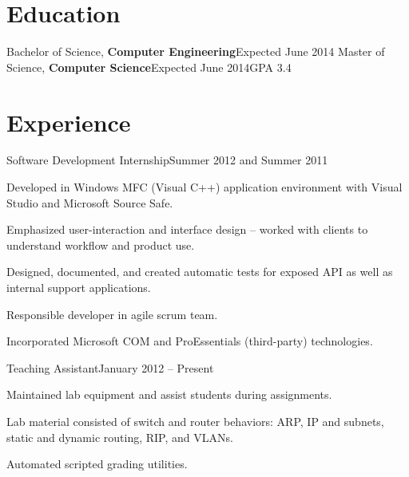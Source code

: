 \documentclass[margin,line,oneside,a4paper]{resume}
\begin{document}
\begin{resume}


   \createContactInformation


   \section{\mysidestyle Education}

   {Bachelor of Science, \textbf{Computer Engineering}}{Expected June 2014}%
   {Master of Science, \textbf{Computer Science}}{Expected June 2014}{GPA 3.4}

   \section{\mysidestyle Experience}

   {Software Development Internship}{Summer 2012 and Summer 2011}
   \begin{list2}
   \item Developed in Windows MFC (Visual C++) application environment with Visual Studio and Microsoft Source Safe.
   \item Emphasized user-interaction and interface design -- worked with clients to understand workflow and product use.
   \item Designed, documented, and created automatic tests for exposed API as well as internal support applications.   
   \item Responsible developer in agile scrum team.
   \item Incorporated Microsoft COM and ProEssentials (third-party) technologies.
   \end{list2}

   {Teaching Assistant}{January 2012 -- Present}
   \begin{list2}
   \item Maintained lab equipment and assist students during assignments.
   \item Lab material consisted of switch and router behaviors: ARP, IP and subnets, static and dynamic routing, RIP, and VLANs.
   \item Automated scripted grading utilities.
   \end{list2}


\end{resume}
\end{document}
